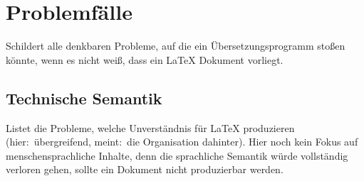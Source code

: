 
\section{Problemfälle}%
Schildert alle denkbaren Probleme, auf die ein Übersetzungsprogramm stoßen könnte, wenn es nicht weiß, dass ein \LaTeX{} Dokument vorliegt.
\subsection{Technische Semantik}%
Listet die Probleme, welche Unverständnis für \LaTeX{} produzieren (hier:\ übergreifend, meint:\ die Organisation dahinter).
Hier noch kein Fokus auf menschensprachliche Inhalte, denn die sprachliche Semantik würde vollständig verloren gehen, sollte ein Dokument nicht produzierbar werden.

